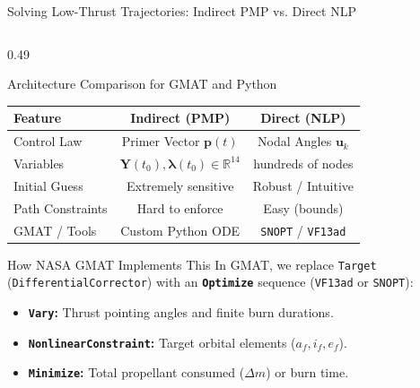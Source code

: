 \documentclass[aspectratio=169, 10pt]{beamer}
\begin{document}
\begin{frame}{Solving Low-Thrust Trajectories: Indirect PMP vs. Direct NLP}
\begin{columns}[T]
        \begin{column}{0.49\textwidth}
            \begin{block}{Architecture Comparison for GMAT and Python}
                \scriptsize
                \centering
                \renewcommand{\arraystretch}{1.15}
                \begin{tabular}{lcc}
                    \toprule
                    \textbf{Feature} & \textbf{Indirect (PMP)} & \textbf{Direct (NLP)} \\
                    \midrule
                    Control Law & Primer Vector $\mathbf{p}(t)$ & Nodal Angles $\mathbf{u}_k$ \\
                    Variables & $\mathbf{Y}(t_0), \boldsymbol{\lambda}(t_0) \in \mathbb{R}^{14}$ & hundreds of nodes \\
                    Initial Guess & Extremely sensitive & Robust / Intuitive \\
                    Path Constraints & Hard to enforce & Easy (bounds) \\
                    GMAT / Tools & Custom Python ODE & \texttt{SNOPT} / \texttt{VF13ad} \\
                    \bottomrule
                \end{tabular}
            \end{block}
            \vspace{-0.15cm}
            \begin{alertblock}{How NASA GMAT Implements This}
                \scriptsize
                In GMAT, we replace \texttt{Target} (\texttt{DifferentialCorrector}) with an \textbf{\texttt{Optimize}} sequence (\texttt{VF13ad} or \texttt{SNOPT}):
                \begin{itemize}\setlength{\itemsep}{0.5pt}\setlength{\topsep}{0pt}
                    \item \textbf{\texttt{Vary}:} Thrust pointing angles and finite burn durations.
                    \item \textbf{\texttt{NonlinearConstraint}:} Target orbital elements ($a_f, i_f, e_f$).
                    \item \textbf{\texttt{Minimize}:} Total propellant consumed ($\Delta m$) or burn time.
                \end{itemize}
            \end{alertblock}
        \end{column}
    \end{columns}
\end{frame}
\end{document}
